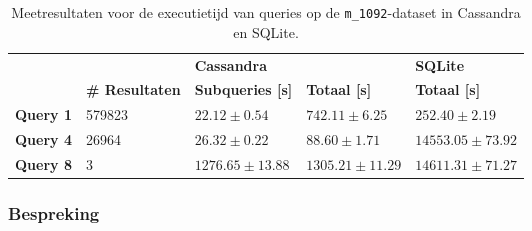 \begin{table}[h]
\centering
\begin{tabular}{@{}lllll@{}}
\cmidrule(l){3-5}
                              &         & \multicolumn{2}{|l|}{\textbf{Cassandra}}                                                      & \multicolumn{1}{l|}{\textbf{SQLite}}                             \\ 
\cmidrule(l){2-5}
\multicolumn{1}{l|}{}  & \multicolumn{1}{l|}{\textbf{\# Resultaten}}               & \multicolumn{1}{l|}{\textbf{Subqueries [s]}} & \multicolumn{1}{l|}{\textbf{Totaal [s]}} & \multicolumn{1}{l|}{\textbf{Totaal [s]}} \\ \midrule
\multicolumn{1}{|l|}{\textbf{Query 1}} & \multicolumn{1}{l|}{579823} & \multicolumn{1}{l|}{$22.12 \pm 0.54$}             & \multicolumn{1}{l|}{$742.11 \pm 6.25$}          & \multicolumn{1}{l|}{$252.40 \pm 2.19$}                         \\
\multicolumn{1}{|l|}{\textbf{Query 4}} & \multicolumn{1}{l|}{26964} &\multicolumn{1}{l|}{$26.32 \pm 0.22$}            & \multicolumn{1}{l|}{$88.60 \pm 1.71$}            & \multicolumn{1}{l|}{$14553.05 \pm 73.92$}                         \\
\multicolumn{1}{|l|}{\textbf{Query 8}} & \multicolumn{1}{l|}{3} &\multicolumn{1}{l|}{$1276.65 \pm 13.88$} & \multicolumn{1}{l|}{$1305.21 \pm 11.29$}       & \multicolumn{1}{l|}{$14611.31 \pm 71.27$}                                \\ 
\bottomrule
\end{tabular}
\caption{Meetresultaten voor de executietijd van queries op de \texttt{m\_1092}-dataset in Cassandra en SQLite.}
\end{table}

\subsubsection{Bespreking}

